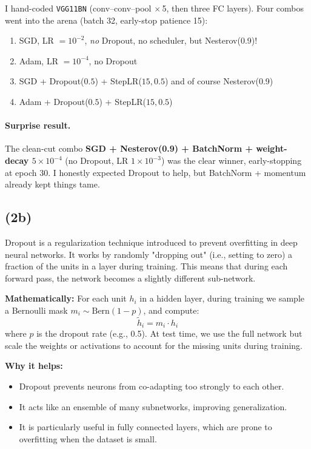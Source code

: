 \documentclass[10pt]{article}
\begin{document}
I hand-coded \texttt{VGG11BN} (conv–conv–pool $\times\,$5, then three FC layers).  
Four combos went into the arena (batch 32, early-stop patience 15):

\begin{enumerate}
  \item SGD, LR $=10^{-2}$, \emph{no} Dropout, no scheduler, but Nesterov(0.9)!
  \item Adam, LR $=10^{-4}$, no Dropout  
  \item SGD + Dropout($0.5$) + StepLR($15,0.5$) and of course Nesterov(0.9)  
  \item Adam + Dropout($0.5$) + StepLR($15,0.5$)  
\end{enumerate}

\paragraph{Surprise result.}  
The clean-cut combo \textbf{SGD + Nesterov(0.9) + BatchNorm + weight-decay $5\!\times\!10^{-4}$} (no Dropout, LR $1\!\times\!10^{-3}$) was the clear winner, early-stopping at epoch 30.  
I honestly expected Dropout to help, but BatchNorm + momentum already kept things tame.
\subsection*{(2b)}
Dropout is a regularization technique introduced to prevent overfitting in deep neural networks. It works by randomly "dropping out" (i.e., setting to zero) a fraction of the units in a layer during training. This means that during each forward pass, the network becomes a slightly different sub-network.

\medskip

\noindent \textbf{Mathematically:} For each unit \( h_i \) in a hidden layer, during training we sample a Bernoulli mask \( m_i \sim \text{Bern}(1 - p) \), and compute:
\[
\tilde{h}_i = m_i \cdot h_i
\]
where \( p \) is the dropout rate (e.g., 0.5). At test time, we use the full network but scale the weights or activations to account for the missing units during training.

\medskip

\noindent \textbf{Why it helps:}
\begin{itemize}
  \item Dropout prevents neurons from co-adapting too strongly to each other.
  \item It acts like an ensemble of many subnetworks, improving generalization.
  \item It is particularly useful in fully connected layers, which are prone to overfitting when the dataset is small.
\end{itemize}
\end{document}
